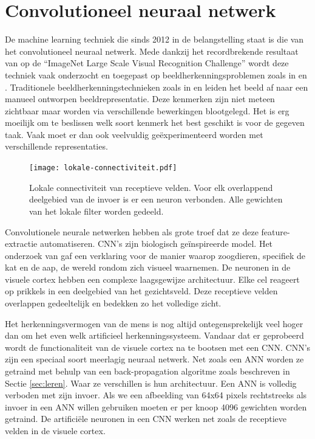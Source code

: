\section{Convolutioneel neuraal netwerk}
De machine learning techniek die sinds 2012 in de belangstelling staat is die van het convolutioneel neuraal netwerk. Mede dankzij het recordbrekende resultaat van \cite{cnn-krizhevsky} op de ``ImageNet Large Scale Visual Recognition Challenge'' wordt deze techniek vaak onderzocht en toegepast op beeldherkenningsproblemen zoals in \cite{cnn-ji} en \cite{cnn-karpathy}.
\npar Traditionele beeldherkenningstechnieken zoals in \cite{perronnin2010improving} en \cite{jhuang2007biologically} leiden het beeld af naar een manueel ontworpen beeldrepresentatie. Deze kenmerken zijn niet meteen zichtbaar maar worden via verschillende bewerkingen blootgelegd. Het is erg moeilijk om te beslissen welk soort kenmerk het best geschikt is voor de gegeven taak. Vaak moet er dan ook veelvuldig ge\"experimenteerd worden met verschillende representaties.
\begin{figure}[!t]
	\centering
	\texttt{[image: lokale-connectiviteit.pdf]}
	\caption{Lokale connectiviteit van receptieve velden. Voor elk overlappend deelgebied van de invoer is er een neuron verbonden. Alle gewichten van het lokale filter worden gedeeld.}
	\label{fig:lokale-connectiviteit}
\end{figure}
\npar Convolutionele neurale netwerken hebben als grote troef dat ze deze feature-extractie automatiseren. CNN's zijn biologisch ge\"inspireerde model. Het onderzoek van \cite{hubel1968receptive} gaf een verklaring voor de manier waarop zoogdieren, specifiek de kat en de aap, de wereld rondom zich visueel waarnemen. De neuronen in de visuele cortex hebben een complexe laagsgewijze architectuur. Elke cel reageert op prikkels in een deelgebied van het gezichtsveld. Deze receptieve velden overlappen gedeeltelijk en bedekken zo het volledige zicht.

\npar Het herkenningsvermogen van de mens is nog altijd ontegensprekelijk veel hoger dan om het even welk artificieel herkenningssysteem. Vandaar dat er geprobeerd wordt de functionaliteit van de visuele cortex na te bootsen met een CNN. 
\npar CNN's zijn een speciaal soort meerlagig neuraal netwerk. Net zoals een ANN worden ze getraind met behulp van een back-propagation algoritme zoals beschreven in Sectie \ref{sec:leren}. Waar ze verschillen is hun architectuur. Een ANN is volledig verboden met zijn invoer. Als we een afbeelding van 64x64 pixels rechtstreeks als invoer in een ANN willen gebruiken moeten er per knoop 4096 gewichten worden getraind. De artifici\"ele neuronen in een CNN werken net zoals de receptieve velden in de visuele cortex.

